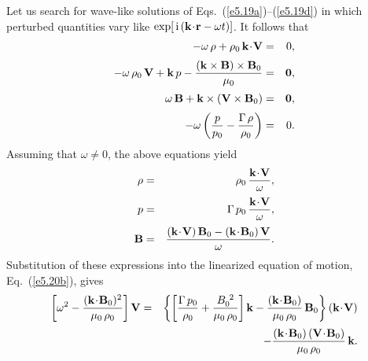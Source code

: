 Let us search for wave-like solutions of Eqs.~(\ref{e5.19a})--(\ref{e5.19d}) in which perturbed
quantities vary like $\exp[\,{\rm i}\,({\bf k}\!\cdot\!{\bf r} - \omega t)]$. 
It follows that
\begin{eqnarray}
-\omega\,\rho + \rho_0\,{\bf k}\!\cdot\!{\bf V} &=& 0,\\[0.5ex]\label{e5.20b}
-\omega\,\rho_0\,{\bf V} + {\bf k}\,p - \frac{ ({\bf k}\times{\bf B})\times
{\bf B}_0}{\mu_0} &=& {\bf 0},\\[0.5ex]
\omega\,{\bf B} + {\bf k}\times({\bf V}\times{\bf B}_0) &= &{\bf 0},\\[0.5ex]
-\omega\left(\frac{p}{p_0} - \frac{{\Gamma}\,\rho}{\rho_0}\right) &=& 0.
\end{eqnarray}
Assuming that $\omega\neq 0$, the above equations yield
\begin{eqnarray}\label{e5.21a}
\rho &=& \rho_0\,\frac{{\bf k}\!\cdot\!{\bf V}}{\omega},\\[0.5ex]\label{e5.21b}
p &=& {\Gamma}\,p_0\,\frac{{\bf k}\!\cdot\!{\bf V}}{\omega},\\[0.5ex]
{\bf B} &=& \frac{ ({\bf k}\!\cdot\!{\bf V})\,{\bf B}_0
- ({\bf k}\!\cdot\!{\bf B}_0)\,{\bf V}}{\omega}.\label{e5.21c}
\end{eqnarray}
Substitution of these expressions into the linearized equation of
motion, Eq.~(\ref{e5.20b}), gives
\begin{eqnarray}\label{e5.22}
\left[ \omega^2 - \frac{({\bf k}\!\cdot\!{\bf B}_0)^2}{\mu_0\,\rho_0}
\right] {\bf V} &=& \left\{ \left[ \frac{{\Gamma}\,p_0}{\rho_0} 
+ \frac{B_0^{~2}}{\mu_0\,\rho_0}\right] {\bf k}
- \frac{({\bf k}\!\cdot\!{\bf B}_0)}{\mu_0\,\rho_0}\,{\bf B}_0
\right\} ({\bf k}\!\cdot\!{\bf V})\nonumber
\\[0.5ex]
&& - \frac{({\bf k}\!\cdot\!{\bf B}_0)\,
({\bf V}\!\cdot\!{\bf B}_0)}{\mu_0\,\rho_0} \,{\bf k}.
\end{eqnarray}

